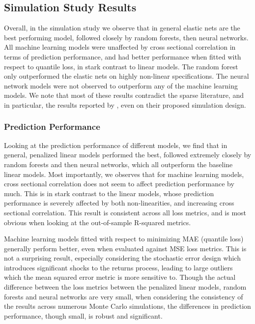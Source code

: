\documentclass{article}
\begin{document}
\subsection{Simulation Study Results}

Overall, in the simulation study we observe that in general elastic nets are the best performing model, followed closely by random forests, then neural networks. All machine learning models were unaffected by cross sectional correlation in terms of prediction performance, and had better performance when fitted with respect to quantile loss, in stark contrast to linear models. The random forest only outperformed the elastic nets on highly non-linear specifications. The neural network models were not observed to outperform any of the machine learning models. We note that most of these results contradict the sparse literature, and in particular, the results reported by \cite{gu_empirical_2018}, even on their proposed simulation design.

\subsubsection{Prediction Performance}

Looking at the prediction performance of different models, we find that in general, penalized linear models performed the best, followed extremely closely by random forests and then neural networks, which all outperform the baseline linear models. Most importantly, we observes that for machine learning models, cross sectional correlation does not seem to affect prediction performance by much. This is in stark contrast to the linear models, whose prediction performance is severely affected by both non-linearities, and increasing cross sectional correlation. This result is consistent across all loss metrics, and is most obvious when looking at the out-of-sample R-squared metrics.

Machine learning models fitted with respect to minimizing MAE (quantile loss) generally perform better, even when evaluated against MSE loss metrics. This is not a surprising result, especially considering the stochastic error design which introduces significant shocks to the returns process, leading to large outliers which the mean squared error metric is more sensitive to. Though the actual difference between the loss metrics between the penalized linear models, random forests and neural networks are very small, when considering the consistency of the results across numerous Monte Carlo simulations, the differences in prediction performance, though small, is robust and significant.
\end{document}
